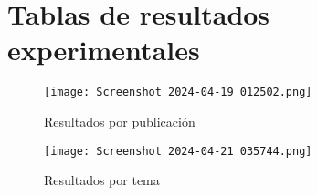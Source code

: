 \documentclass[acmtog]{acmart}
\begin{document}



\section{Tablas de resultados experimentales}

\begin{figure}
    \centering
    \texttt{[image: Screenshot 2024-04-19 012502.png]}
    \caption{Resultados por publicación}
    
\end{figure}

\begin{figure}
    \centering
    \texttt{[image: Screenshot 2024-04-21 035744.png]}
    \caption{Resultados por tema}
    \label{fig:enter-label}
\end{figure}
\end{document}
